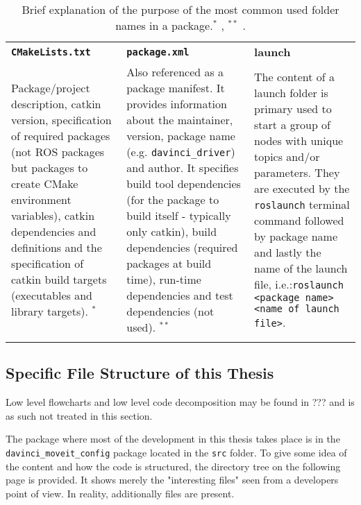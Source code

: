 \begin{table}[H]
\begin{tabularx}{\textwidth}{X X X}
\rowcolor{HeaderBlue} 
 \textbf{\texttt{CMakeLists.txt}} & \textbf{\texttt{package.xml}}& \textbf{launch} \\
Package/project description, \gls{catkin} version, specification of required packages (not ROS packages but packages to create CMake environment variables), catkin dependencies and definitions and the specification of catkin build targets (executables and library targets). 
$^*$  & Also referenced as a package manifest. It provides information about the maintainer, version, package name (e.g. \texttt{davinci\_driver}) and author. It specifies build tool dependencies (for the package to build itself - typically only catkin), build dependencies (required packages at build time), run-time dependencies and test dependencies (not used).  $^{**}$ & The content of a launch folder is primary used to start a group of nodes with unique topics and/or parameters. They are executed by the \texttt{roslaunch} terminal command followed by package name and lastly the name of the launch file, i.e.:\newline \texttt{roslaunch <package name> <name of launch file>}. \\  \rowcolor{textBlue}
\end{tabularx}
	\caption{Brief explanation of the purpose of the most common used folder names in a package.\newline $^*$ \citep{bib:CmakeLists}, $^{**}$ \citep{bib:package}.} 
\label{tab:eleb}
\end{table}
\subsection*{Specific File Structure of this Thesis}
Low level flowcharts and low level code decomposition may be found in ??? and is as such not treated in this section.

The package where most of the development in this thesis takes place is in the \texttt{davinci\_moveit\_config} package located in the \texttt{src} folder. To give some idea of the content and how the code is structured, the directory tree on the following page is provided. It shows merely the "interesting files" seen from a developers point of view. In reality, additionally files are present. 
\newpage
\renewcommand*\DTstylecomment{\rmfamily\color{gray}\textsc}
\renewcommand*\DTstyle{\ttfamily\textcolor{blue}}

